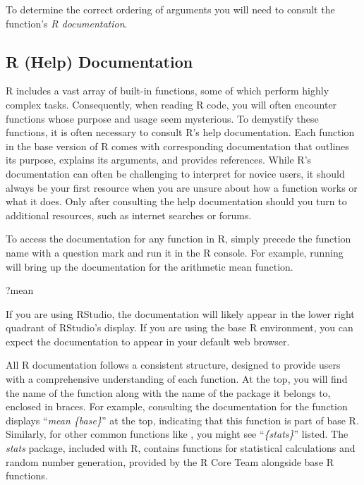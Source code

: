 \noindent
To determine the correct ordering of arguments you will need to consult the function's \textit{R documentation}.

\subsection{R (Help) Documentation}

R includes a vast array of built-in functions, some of which perform highly complex tasks. Consequently, when reading R code, you will often encounter functions whose purpose and usage seem mysterious. To demystify these functions, it is often necessary to consult R's help documentation. Each function in the base version of R comes with corresponding documentation that outlines its purpose, explains its arguments, and provides references. While R's documentation can often be challenging to interpret for novice users, it should always be your first resource when you are unsure about how a function works or what it does. Only after consulting the help documentation should you turn to additional resources, such as internet searches or forums.

To access the documentation for any function in R, simply precede the function name with a question mark and run it in the R console. For example, running  will bring up the documentation for the arithmetic mean function.

\begin{inR}
?mean
\end{inR}

\vspace{1em}

\noindent If you are using RStudio, the documentation will likely appear in the lower right quadrant of RStudio's display. If you are using the base R environment, you can expect the documentation to appear in your default web browser.

All R documentation follows a consistent structure, designed to provide users with a comprehensive understanding of each function. At the top, you will find the name of the function along with the name of the package it belongs to, enclosed in braces. For example, consulting the documentation for the  function displays ``\textit{mean \{base\}}'' at the top, indicating that this function is part of base R. Similarly, for other common functions like , you might see ``\textit{\{stats\}}'' listed. The \textit{stats} package, included with R, contains functions for statistical calculations and random number generation, provided by the R Core Team alongside base R functions.

